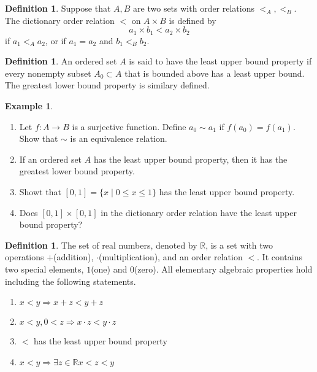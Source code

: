 \documentclass{beamer}
\theoremstyle{plain}
\theoremstyle{definition}
\newtheorem{defn}[thm]{Definition}
\newtheorem{exmp}[thm]{Example}
\begin{document}
\begin{frame}
\begin{defn}
	Suppose that $A, B$ are two sets with order
	relations $<_A, <_B$. The dictionary order
	relation $<$ on $A\times B$ is defined by
		$$a_1\times b_1 < a_2\times b_2$$
	if $a_1<_Aa_2$, or if $a_1=a_2$ and $b_1<_Bb_2$.
\end{defn}
\begin{defn}
	An ordered set $A$ is said to have the 
	least upper bound property if every nonempty
	subset $A_0\subset A$ that is bounded above has
	a least upper bound. The greatest lower bound
	property is similary defined.
\end{defn}
\end{frame}

\begin{frame}
\begin{exmp}
	\begin{enumerate}
		\item Let $f:A\to B$ is a surjective function.
		Define $a_0\sim a_1$ if $f(a_0)=f(a_1)$.
		Show that $\sim$ is an equivalence relation.
		\item If an ordered set $A$ has the least
		upper bound property, then it has the
		greatest lower bound property.
		\item Showt that $[0,1] 
		= \{x\mid0\le x\le 1\}$ has the least upper
		bound property.
		\item Does $[0,1]\times[0,1]$ in the dictionary
		order relation have the least upper bound
		property?
	\end{enumerate}
\end{exmp}	
\end{frame}

\begin{frame}
\begin{defn}
	The set of real numbers, denoted by $\mathbb R$,
	is a set with two operations $+$(addition), 
	$\cdot$(multiplication), 
	and an order relation $<$.
	It contains two special elements,
	$1$(one) and $0$(zero).
	All elementary algebraic properties hold 
	including the following statements.
	\begin{enumerate}
		\item $x<y\Rightarrow x+z<y+z$
		\item $x<y, 0<z \Rightarrow 
			x\cdot z<y\cdot z$
		\item $<$ has the least upper bound property
		\item $x<y\Rightarrow\exists z\in \mathbb R
			x<z<y$
	\end{enumerate}
\end{defn}
\end{frame}
\end{document}
